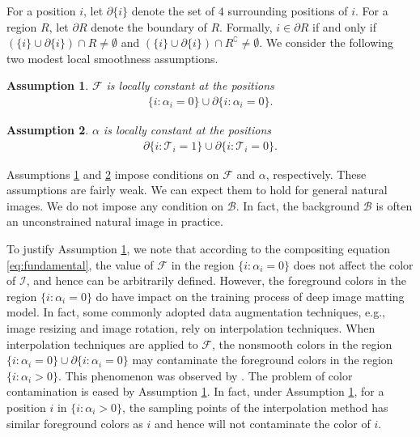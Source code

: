 \documentclass{article}
\theoremstyle{plain}
\newtheorem{assumption}{Assumption}
\begin{document}
For a position $i$, let $\partial \{i\}$ denote the set of $4$ surrounding positions of $i$.
For a region $R$, let $\partial R$ denote the boundary of $R$.
Formally, $i \in \partial R$ if and only if $(\{i\} \cup \partial \{i\}) \cap R \neq \emptyset$ and $(\{i\} \cup \partial \{i\}) \cap R^\complement \neq \emptyset$.
We consider the following two modest local smoothness assumptions.
\begin{assumption}\label{assumption1}
        $\mathcal F$ is locally constant at the positions
        {\small
            \begin{align*}
        \{i : \alpha_i = 0 \} \cup \partial \{i : \alpha_i = 0 \}.
    \end{align*}
        }\end{assumption}
\begin{assumption}\label{assumption2}
        $\alpha$ is locally constant at the positions
        {\small
            \begin{align*}
         \partial \{i: \mathcal T_i =1\} \cup \partial\{i: \mathcal T_i =0\}.
            \end{align*}
        }\end{assumption}
Assumptions \ref{assumption1} and \ref{assumption2} impose conditions on $\mathcal F$ and $\alpha$, respectively.
These assumptions are fairly weak.
We can expect them to hold for general natural images.
We do not impose any condition on $\mathcal B$.
In fact,
the background $\mathcal B$ is often an unconstrained natural image in practice.

To justify Assumption \ref{assumption1}, 
we note that according to the 
compositing equation \eqref{eq:fundamental},
the value of $\mathcal F$ in the region $\{i:\alpha_i = 0\}$ does not affect the color of $\mathcal I$, and hence can be arbitrarily defined.
However, the foreground colors in the region $\{i:\alpha_i = 0\}$ do have impact on the training process of deep image matting model.
In fact, some commonly adopted data augmentation techniques, e.g., image resizing and image rotation, rely on interpolation techniques.
When interpolation techniques are applied to $\mathcal F$,
the nonsmooth colors in the region $\{i:\alpha_i = 0\} \cup \partial \{i : \alpha_i = 0 \}$ may contaminate the foreground colors in the region $\{i:\alpha_i > 0\}$.
This phenomenon was observed by \cite{Forte2020FBA}.
The problem of color contamination is eased by Assumption \ref{assumption1}.
In fact, under Assumption \ref{assumption1},
for a position $i$ in $\{i:\alpha_i > 0\}$,
the sampling points of the interpolation method has similar foreground colors as $i$ and hence will not contaminate the color of $i$.
\end{document}
